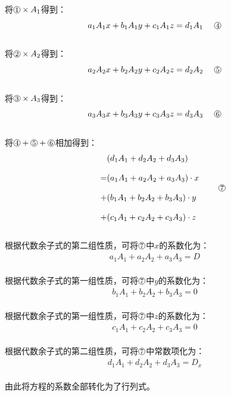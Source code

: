 \documentclass[UTF8]{ctexart}
\newcommand*{\circled}[1]{\lower.7ex\hbox{\tikz\draw (0pt, 0pt)circle (.4em) node {\makebox[0em][c]{\footnotesize #1}};}}
\begin{document}
\newpage
    将$\circled{1}\times A_1$得到：
    \begin{align}
        a_1A_1x+b_1A_1y+c_1A_1z=d_1A_1~~~~\circled{4}
    \end{align}\\
    将$\circled{2}\times A_2$得到：
    \begin{align}
        a_2A_2x+b_2A_2y+c_2A_2z=d_2A_2~~~~\circled{5}
    \end{align}\\
    将$\circled{3}\times A_3$得到：
    \begin{align}
        a_3A_3x+b_3A_3y+c_3A_3z=d_3A_3~~~~\circled{6}
    \end{align}\\
    将$\circled{4}+\circled{5}+\circled{6}$相加得到：\vspace{-5pt}
    \begin{align}
       ~~~~~~
       \begin{split}
            &(d_1A_1+d_2A_2+d_3A_3)\\[3mm]
            =&(a_1A_1+a_2A_2+a_3A_3)\cdot x\\[3mm]
            +&(b_1A_1+b_2A_2+b_3A_3)\cdot y\\[3mm]
            +&(c_1A_1+c_2A_2+c_3A_3)\cdot z
        \end{split}~~~~~~~\circled{7}
    \end{align}\\[2mm]
    根据代数余子式的第二组性质，可将$\circled{7}$中$x$的系数化为：
    \begin{align}
        a_1A_1+a_2A_2+a_3A_3=D
    \end{align}\\
    根据代数余子式的第一组性质，可将$\circled{7}$中$y$的系数化为：
    \begin{align}
        b_1A_1+b_2A_2+b_3A_3=0
    \end{align}\\
    根据代数余子式的第一组性质，可将$\circled{7}$中$z$的系数化为：
    \begin{align}
        c_1A_1+c_2A_2+c_3A_3=0
    \end{align}\\
    根据代数余子式的第二组性质，可将$\circled{7}$中常数项化为：
    \begin{align}
        d_1A_1+d_2A_2+d_3A_3=D_x
    \end{align}\\
    由此将方程的系数全部转化为了行列式。

\newpage
\end{document}
